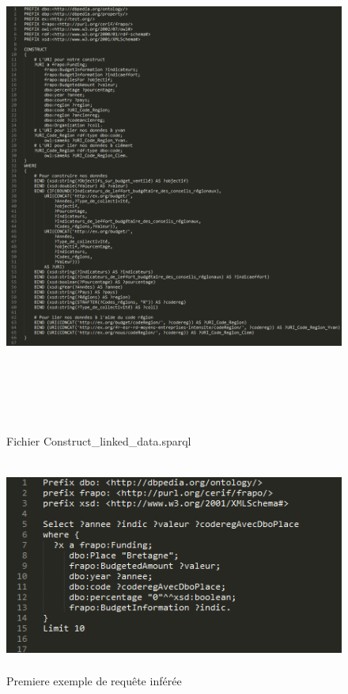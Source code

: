 \documentclass[a4paper,sffamily,12pt]{article}
\begin{document}
		\begin{figure}[!h]
			
			\vspace{0.5cm}	
			\centerline{\includegraphics[height=17cm]{picture/constructv2.png}}
			\caption{Fichier Construct\_linked\_data.sparql}
			\label{constructv2}
			
		\end{figure}		
	
		\newpage		

		\begin{figure}[!h]

			\vspace{0.5cm}			
			\centerline{\includegraphics[height=7cm]{picture/inference1.png}}
			\caption{Premiere exemple de requête inférée}
			\label{inf1}
			
		\end{figure}		
	
\end{document}
